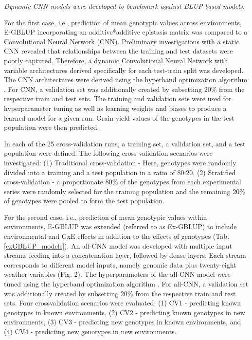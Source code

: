 \documentclass[english, biblatex]{lni}
\begin{document}
\textit{Dynamic CNN models were developed to benchmark against BLUP-based models.}

For the first case, i.e., prediction of mean genotypic values across environments, E-GBLUP incorporating an additive*additive epistasis matrix \cite{jiang2015modeling} was compared to a Convolutional Neural Network (CNN). Preliminary investigations with a static CNN revealed that relationships between the training and test datasets were poorly captured. Therefore, a dynamic Convolutional Neural Network with variable architectures derived specifically for each test-train split was developed. The CNN architectures were derived using the hyperband optimization algorithm \cite{li_hyperband_2018}. For CNN, a validation set was additionally created by subsetting 20\% from the respective train and test sets. The training and validation sets were used for hyperparameter tuning as well as learning weights and biases to produce a learned model for a given run. Grain yield values of the genotypes in the test population were then predicted.

In each of the 25 cross-validation runs, a training set, a validation set, and a test population were defined. The following cross-validation scenarios were investigated: (1) Traditional cross-validation - Here, genotypes were randomly divided into a training and a test population in a ratio of 80:20, (2) Stratified cross-validation - a proportionate 80\% of the genotypes from each experimental series were randomly selected for the training population and the remaining 20\% of genotypes were pooled to form the test population.

For the second case, i.e., prediction of mean genotypic values within environments, E-GBLUP was extended (referred to as Ex-GBLUP) to include environmental and GxE effects in addition to the effects of genotypes (Tab. \ref{exGBLUP_models}). An all-CNN model was developed with multiple input streams feeding into a concatenation layer, followed by dense layers. Each stream corresponds to different model inputs, namely genomic data plus twenty-eight weather variables (Fig. 2). The hyperparameters of the all-CNN model were tuned using the hyperband optimization algorithm \cite{li_hyperband_2018}. For all-CNN, a validation set was additionally created by subsetting 20\% from the respective train and test sets. Four cross\-validation scenarios were evaluated: (1) CV1 - predicting known genotypes in known environments, (2) CV2 - predicting known genotypes in new environments, (3) CV3 - predicting new genotypes in known environments, and (4) CV4 - predicting new genotypes in new environments.
\end{document}
